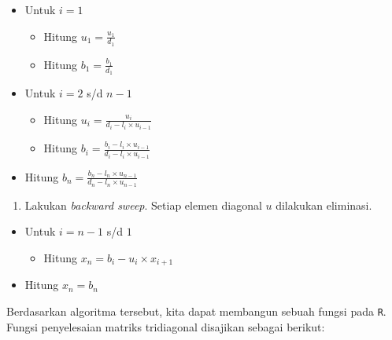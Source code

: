 \documentclass[]{book}
\providecommand{\tightlist}{%
  \setlength{\itemsep}{0pt}\setlength{\parskip}{0pt}}
\theoremstyle{definition}
\theoremstyle{definition}
\theoremstyle{definition}
\theoremstyle{remark}
\begin{document}
\begin{itemize}
\item
  Untuk \(i=1\)

  \begin{itemize}
  \tightlist
  \item
    Hitung \(u_1=\frac{u_1}{d_1}\)
  \item
    Hitung \(b_1=\frac{b_1}{d_1}\)
  \end{itemize}
\item
  Untuk \(i=2\) s/d \(n-1\)

  \begin{itemize}
  \tightlist
  \item
    Hitung \(u_i=\frac{u_i}{d_i-l_i\times u_{i-1}}\)
  \item
    Hitung \(b_i=\frac{b_i-l_i\times u_{i-1}}{d_i-l_i\times u_{i-1}}\)
  \end{itemize}
\item
  Hitung \(b_n=\frac{b_n-l_n\times u_{n-1}}{d_n-l_n\times u_{n-1}}\)
\end{itemize}

\begin{enumerate}
\def\labelenumi{\arabic{enumi}.}
\setcounter{enumi}{2}
\tightlist
\item
  Lakukan \emph{backward sweep}. Setiap elemen diagonal \(u\) dilakukan eliminasi.
\end{enumerate}

\begin{itemize}
\item
  Untuk \(i=n-1\) s/d \(1\)

  \begin{itemize}
  \tightlist
  \item
    Hitung \(x_n=b_i-u_i\times x_{i+1}\)
  \end{itemize}
\item
  Hitung \(x_n=b_n\)
\end{itemize}

Berdasarkan algoritma tersebut, kita dapat membangun sebuah fungsi pada \texttt{R}. Fungsi penyelesaian matriks tridiagonal disajikan sebagai berikut:
\end{document}
